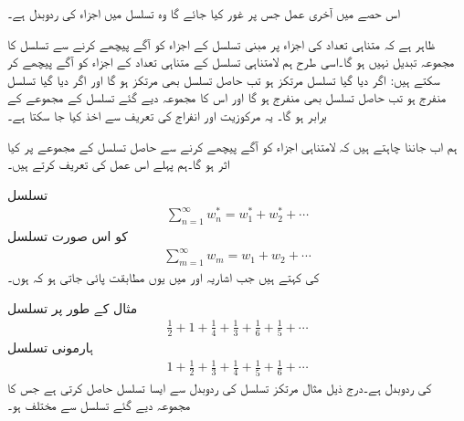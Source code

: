 اس حصے میں آخری عمل جس پر غور کیا جائے گا وہ تسلسل  میں اجزاء کی ردوبدل ہے۔

ظاہر ہے کہ متناہی تعداد کی اجزاء پر مبنی تسلسل کے اجزاء کو آگے پیچھے کرنے سے تسلسل کا مجموعہ تبدیل نہیں ہو گا۔اسی طرح ہم لامتناہی تسلسل کے متناہی تعداد کے اجزاء کو آگے پیچھے کر سکتے ہیں: اگر دیا گیا تسلسل مرتکز ہو تب حاصل تسلسل بھی مرتکز ہو گا اور اگر دیا گیا تسلسل منفرج ہو تب حاصل تسلسل بھی منفرج ہو گا اور اس کا مجموعہ دیے گئے تسلسل کے مجموعے کے برابر ہو گا۔ یہ مرکوزیت اور انفراج کی تعریف سے اخذ کیا جا سکتا ہے۔

ہم اب جاننا چاہتے ہیں کہ لامتناہی اجزاء کو آگے پیچھے کرنے سے حاصل تسلسل کے مجموعے پر کیا اثر ہو گا۔ہم پہلے  اس عمل کی تعریف کرتے ہیں۔

تسلسل
\begin{align*}
\sum\limits_{n=1}^{\infty} w^*_n=w^*_1+w^*_2+\cdots
\end{align*}
کو اس صورت تسلسل
\begin{align*}
\sum\limits_{m=1}^{\infty}w_m=w_1+w_2+\cdots
\end{align*}
کی   کہتے ہیں جب اشاریہ  اور  میں یوں مطابقت پائی جاتی ہو کہ  ہوں۔ 

مثال کے طور پر تسلسل
\begin{align*}
\frac{1}{2}+1+\frac{1}{4}+\frac{1}{3}+\frac{1}{6}+\frac{1}{5}+\cdots
\end{align*}
ہارمونی تسلسل
\begin{align*}
1+\frac{1}{2}+\frac{1}{3}+\frac{1}{4}+\frac{1}{5}+\frac{1}{6}+\cdots
\end{align*}
کی ردوبدل ہے۔درج ذیل مثال مرتکز تسلسل کی ردوبدل سے ایسا تسلسل حاصل کرتی ہے جس کا مجموعہ دیے گئے تسلسل سے مختلف ہو۔

